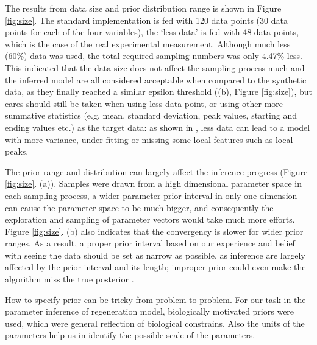The results from data size and prior distribution range is shown in Figure \ref{fig:size}. The standard implementation is fed with 120 data points (30 data points for each of the four variables), the `less data' is fed with 48 data points, which is the case of the real experimental measurement. Although much less (60\%) data was used, the total required sampling numbers was only 4.47\% less. This indicated that the data size does not affect the sampling process much and the inferred model are all considered acceptable when compared to the synthetic data, as they finally reached a similar epsilon threshold ((b), Figure \ref{fig:size}), but cares should still be taken when using less data point, or using other more summative statistics (e.g. mean, standard deviation, peak values, starting and ending values etc.) as the target data: as shown in \cite{ref:disease}, less data can lead to a model with more variance, under-fitting or missing some local features such as local peaks.

The prior range and distribution can largely affect the inference progress (Figure \ref{fig:size}. (a)). Samples were drawn from a high dimensional parameter space in each sampling process, a wider parameter prior interval in only one dimension can cause the parameter space to be much bigger, and consequently the exploration and sampling of parameter vectors would take much more efforts. Figure \ref{fig:size}. (b) also indicates that the convergency is slower for wider prior ranges. As a result, a proper prior interval based on our experience and belief with seeing the data should be set as narrow as possible, as inference are largely affected by the prior interval and its length; improper prior could even make the algorithm miss the true posterior \cite{ref:abcsysbio}.

How to specify prior can be tricky from problem to problem. For our task in the parameter inference of regeneration model, biologically motivated priors were used, which were general reflection of biological constrains. Also the units of the parameters help us in identify the possible scale of the parameters.




